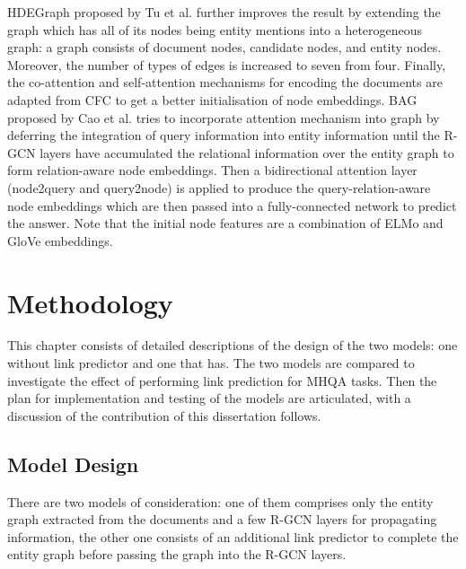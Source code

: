 \documentclass[12pt]{report}
\begin{document}
HDEGraph proposed by Tu et al. \cite{tu_multi-hop_2019} further improves the result by extending the graph which has all of its nodes being entity mentions into a heterogeneous graph: a graph consists of document nodes, candidate nodes, and entity nodes. Moreover, the number of types of edges is increased to seven from four. Finally, the co-attention and self-attention mechanisms for encoding the documents are adapted from CFC to get a better initialisation of node embeddings. BAG proposed by Cao et al. \cite{cao_bag:_2019} tries to incorporate attention mechanism into graph by deferring the integration of query information into entity information until the R-GCN layers have accumulated the relational information
over the entity graph to form relation-aware node embeddings. Then a bidirectional attention layer (node2query and query2node) is applied to produce the query-relation-aware node embeddings which are then passed into a fully-connected network to predict the answer. Note that the initial node features are a combination of ELMo and GloVe \cite{pennington_glove:_2014} embeddings.

\chapter{Methodology}
This chapter consists of detailed descriptions of the design of the two models: one without link predictor and one that has. The two models are compared to investigate the effect of performing link prediction for MHQA tasks. Then the plan for implementation and testing of the models are articulated, with a discussion of the contribution of this dissertation follows.

\section{Model Design}
There are two models of consideration: one of them comprises only the entity graph extracted from the documents and a few R-GCN layers for propagating information, the other one consists of an additional link predictor to complete the entity graph before passing the graph into the R-GCN layers.
\end{document}
